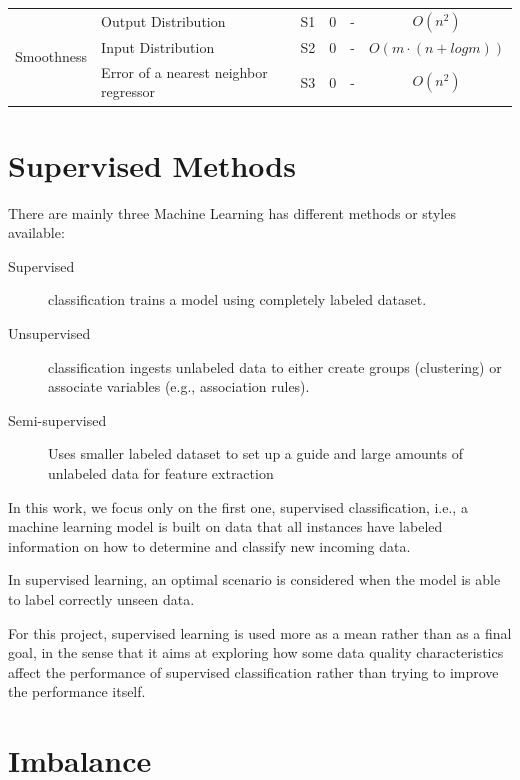 \begin{center}
\begin{scriptsize}
\begin{longtable}{ | r | l | l | c | c | c | }
\multirow{3}{*}{Smoothness} & Output Distribution & 
S1 & 0 & - & $O(n^2)$ \\
\cline{2-6}
& Input Distribution &
S2 & 0 & - & $O(m \cdot (n + log m))$ \\
\cline{2-6}
& Error of a nearest neighbor regressor &
S3 & 0 & - & $O(n^2)$ \\
\hline

\end{longtable}
\end{scriptsize}
\end{center}

\section{Supervised Methods}

There are mainly three Machine Learning has different methods or styles 
available:

\begin{description}
    \item [Supervised] classification trains a model using completely labeled 
	dataset.
    \item [Unsupervised] classification ingests unlabeled data to either create 
	groups (clustering) or associate variables (e.g., association rules).
    \item [Semi-supervised] Uses smaller labeled dataset to set up a guide and 
    large amounts of unlabeled data for feature extraction
\end{description}

In this work, we focus only on the first one, supervised classification, i.e., a
machine learning model is built on data that all instances have labeled 
information on how to determine and classify new incoming data.

In supervised learning, an optimal scenario is considered when the model is able
to label correctly unseen data. 

For this project, supervised learning is used more as a mean rather than as a 
final goal, in the sense that it aims at exploring how some data quality 
characteristics affect the performance of supervised classification rather than 
trying to improve the performance itself. 

\section{Imbalance}
\label{sec:imbtechniques}

